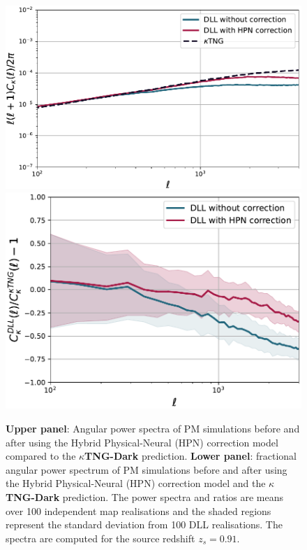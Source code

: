 \documentclass{aa}
\begin{document}
\begin{figure}
    \centering
    \includegraphics[width=0.95\columnwidth]{paper/figures/cls_DLL_vs_ktng_hpn.pdf}
        \includegraphics[width=\columnwidth]{paper/figures/res_cls_DLL_vs_ktng_hpn.pdf}
    \caption{
    \textbf{Upper panel}: Angular power spectra of PM simulations before and after using the Hybrid Physical-Neural (HPN) correction model compared to the \textbf{$\kappa$TNG-Dark} prediction. \textbf{Lower panel}: fractional angular power spectrum of PM simulations before and after using the Hybrid Physical-Neural (HPN) correction model and the \textbf{$\kappa$TNG-Dark} prediction. The power spectra and ratios are means over 100 independent map realisations and the shaded regions represent the standard deviation from 100 DLL realisations. The spectra are computed for the source redshift $z_s=0.91$. 
}
    \label{fig:ps_comp}
\end{figure}
\end{document}
